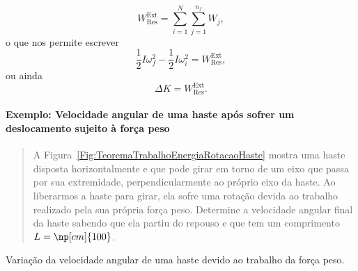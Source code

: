 \begin{equation}
    W_{\text{Res}}^{\text{Ext}} = \sum_{i = 1}^N\sum_{j=1}^{n_f} W_j,
\end{equation}
%
o que nos permite escrever
\begin{equation}
    \frac{1}{2}I\omega_f^2 - \frac{1}{2}I\omega_i^2 = W_{\text{Res}}^{\text{Ext}},
\end{equation}
%
ou ainda
\begin{equation}
    \Delta K = W_{\text{Res}}^{\text{Ext}}.
\end{equation}

\paragraph{Exemplo: Velocidade angular de uma haste após sofrer um deslocamento sujeito à força peso}

\begin{quote}
A Figura~\ref{Fig:TeoremaTrabalhoEnergiaRotacaoHaste} mostra uma haste disposta horizontalmente e que pode girar em torno de um eixo que passa por sua extremidade, perpendicularmente ao próprio eixo da haste. Ao liberarmos a haste para girar, ela sofre uma rotação devida ao trabalho realizado pela sua própria força peso. Determine a velocidade angular final da haste sabendo que ela partiu do repouso e que tem um comprimento $L = \np[cm]{100}$.
\end{quote}

\begin{marginfigure}
\centering
{}
\caption{Variação da velocidade angular de uma haste devido ao trabalho da força peso. \label{Fig:TeoremaTrabalhoEnergiaRotacaoHaste}}
\end{marginfigure}

